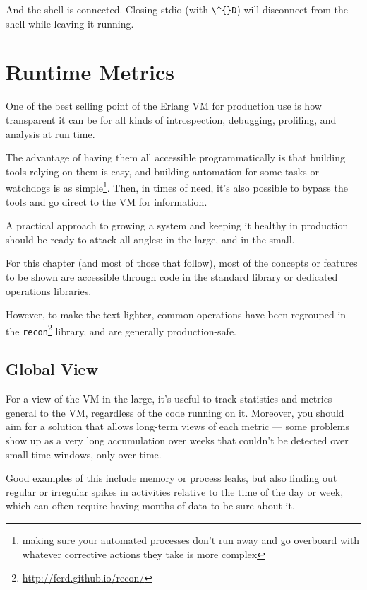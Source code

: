 \documentclass[11pt, oneside]{book}   	%
\newcommand{\otpapp}[1]{\Verb`#1`}
\newcommand{\command}[1]{\Verb`#1`}
\begin{document}
And the shell is connected. Closing stdio (with \command{\^{}D}) will disconnect from the shell while leaving it running.

\chapter{Runtime Metrics}
\label{chap:runtime-metrics}

One of the best selling point of the Erlang VM for production use is how transparent it can be for all kinds of introspection, debugging, profiling, and analysis at run time.

The advantage of having them all accessible programmatically is that building tools relying on them is easy, and building automation for some tasks or watchdogs is as simple\footnote{making sure your automated processes don't run away and go overboard with whatever corrective actions they take is more complex}. Then, in times of need, it's also possible to bypass the tools and go direct to the VM for information.

A practical approach to growing a system and keeping it healthy in production should be ready to attack all angles: in the large, and in the small.

For this chapter (and most of those that follow), most of the concepts or features to be shown are accessible through code in the standard library or dedicated operations libraries. 

However, to make the text lighter, common operations have been regrouped in the \otpapp{recon}\footnote{\href{http://ferd.github.io/recon/}{http://ferd.github.io/recon/}} library, and are generally production-safe.

\section{Global View}
\label{sec:global-view}

For a view of the VM in the large, it's useful to track statistics and metrics general to the VM, regardless of the code running on it. Moreover, you should aim for a solution that allows long-term views of each metric — some problems show up as a very long accumulation over weeks that couldn't be detected over small time windows, only over time.

Good examples of this include memory or process leaks, but also finding out regular or irregular spikes in activities relative to the time of the day or week, which can often require having months of data to be sure about it.
\end{document}
